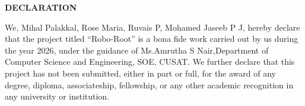 \clearpage
{}
{}
\thispagestyle{footeronly}
\begin{center}
{\fontsize{16}{20}\selectfont \textbf{DECLARATION}}
\end{center}

\justifying
\noindent
We, Mihal Palakkal, Rose Maria, Ruvais P, Mohamed Jaseeb P J, hereby declare that the project titled 
{``Robo-Root''} 
is a bona fide work carried out by us during the year 2026, 
under the guidance of {Ms.Amrutha S Nair},Department of Computer Science and Engineering, SOE, CUSAT. 
We further declare that this project has not been submitted, 
 either in part or full, for the award of any degree, diploma, 
 associateship, fellowship, or any other academic recognition 
in any university or institution.

\vfill

\clearpage